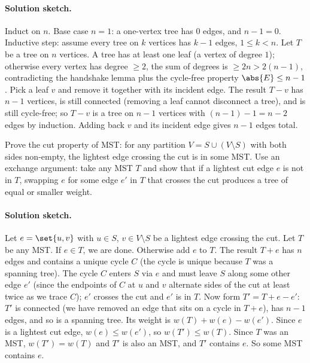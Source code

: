 \paragraph{Solution sketch.}
Induct on $n$. Base case $n = 1$: a one-vertex tree has $0$ edges,
and $n - 1 = 0$. Inductive step: assume every tree on $k$ vertices
has $k - 1$ edges, $1 \leq k < n$. Let $T$ be a tree on $n$
vertices. A tree has at least one leaf (a vertex of degree $1$);
otherwise every vertex has degree $\geq 2$, the sum of degrees is
$\geq 2n > 2(n - 1)$, contradicting the handshake lemma plus the
cycle-free property $\abs{E} \leq n - 1$. Pick a leaf $v$ and
remove it together with its incident edge. The result $T - v$ has
$n - 1$ vertices, is still connected (removing a leaf cannot
disconnect a tree), and is still cycle-free; so $T - v$ is a tree
on $n - 1$ vertices with $(n - 1) - 1 = n - 2$ edges by induction.
Adding back $v$ and its incident edge gives $n - 1$ edges total.

\begin{exercise}
Prove the cut property of MST: for any partition $V = S \cup (V
\setminus S)$ with both sides non-empty, the lightest edge crossing
the cut is in some MST. Use an exchange argument: take any MST $T$
and show that if a lightest cut edge $e$ is not in $T$, swapping
$e$ for some edge $e'$ in $T$ that crosses the cut produces a tree
of equal or smaller weight.
\end{exercise}

\paragraph{Solution sketch.}
Let $e = \set{u, v}$ with $u \in S$, $v \in V \setminus S$ be a
lightest edge crossing the cut. Let $T$ be any MST. If $e \in T$,
we are done. Otherwise add $e$ to $T$. The result $T + e$ has $n$
edges and contains a unique cycle $C$ (the cycle is unique because
$T$ was a spanning tree). The cycle $C$ enters $S$ via $e$ and
must leave $S$ along some other edge $e'$ (since the endpoints of
$C$ at $u$ and $v$ alternate sides of the cut at least twice as we
trace $C$); $e'$ crosses the cut and $e'$ is in $T$. Now form $T'
= T + e - e'$: $T'$ is connected (we have removed an edge that
sits on a cycle in $T + e$), has $n - 1$ edges, and so is a
spanning tree. Its weight is $w(T) + w(e) - w(e')$. Since $e$
is a lightest cut edge, $w(e) \leq w(e')$, so $w(T') \leq w(T)$.
Since $T$ was an MST, $w(T') = w(T)$ and $T'$ is also an MST, and
$T'$ contains $e$. So some MST contains $e$.

